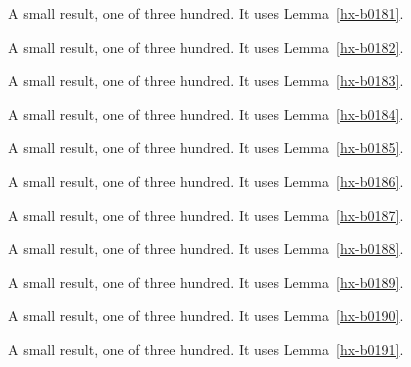 \begin{lemma}[Bulk 182]\label{hx-b0182}
A small result, one of three hundred. It uses Lemma~\ref{hx-b0181}.
\end{lemma}

\begin{lemma}[Bulk 183]\label{hx-b0183}
A small result, one of three hundred. It uses Lemma~\ref{hx-b0182}.
\end{lemma}

\begin{lemma}[Bulk 184]\label{hx-b0184}
A small result, one of three hundred. It uses Lemma~\ref{hx-b0183}.
\end{lemma}

\begin{lemma}[Bulk 185]\label{hx-b0185}
A small result, one of three hundred. It uses Lemma~\ref{hx-b0184}.
\end{lemma}

\begin{lemma}[Bulk 186]\label{hx-b0186}
A small result, one of three hundred. It uses Lemma~\ref{hx-b0185}.
\end{lemma}

\begin{lemma}[Bulk 187]\label{hx-b0187}
A small result, one of three hundred. It uses Lemma~\ref{hx-b0186}.
\end{lemma}

\begin{lemma}[Bulk 188]\label{hx-b0188}
A small result, one of three hundred. It uses Lemma~\ref{hx-b0187}.
\end{lemma}

\begin{lemma}[Bulk 189]\label{hx-b0189}
A small result, one of three hundred. It uses Lemma~\ref{hx-b0188}.
\end{lemma}

\begin{lemma}[Bulk 190]\label{hx-b0190}
A small result, one of three hundred. It uses Lemma~\ref{hx-b0189}.
\end{lemma}

\begin{lemma}[Bulk 191]\label{hx-b0191}
A small result, one of three hundred. It uses Lemma~\ref{hx-b0190}.
\end{lemma}

\begin{lemma}[Bulk 192]\label{hx-b0192}
A small result, one of three hundred. It uses Lemma~\ref{hx-b0191}.
\end{lemma}

